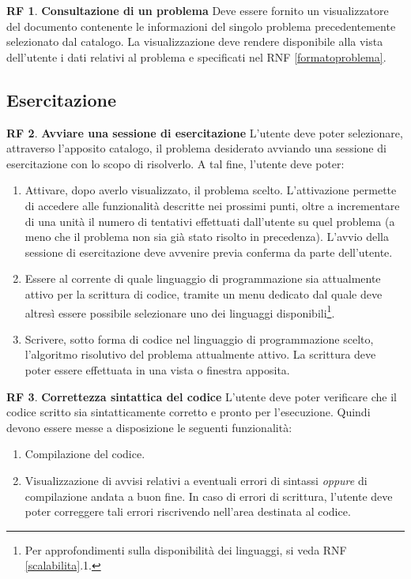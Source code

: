 \documentclass[11pt, a4paper]{article}
\theoremstyle{definition}
\newtheorem{funcreq}{RF} %
\begin{document}
\begin{funcreq}
\label{seeproblem}
\textbf{Consultazione di un problema }
Deve essere fornito un visualizzatore del documento contenente le
informazioni del singolo problema precedentemente selezionato dal
catalogo. La visualizzazione deve rendere disponibile alla vista
dell'utente i dati relativi al problema e specificati nel RNF
\ref{formatoproblema}.
\end{funcreq}

\subsection{Esercitazione}
\begin{funcreq}
\label{exesession}
\textbf{Avviare una sessione di esercitazione }
L'utente deve poter selezionare, attraverso l'apposito catalogo, il
problema desiderato avviando una sessione di esercitazione con lo scopo
di risolverlo. A tal fine, l'utente deve poter:
\begin{enumerate}
    \item Attivare, dopo averlo visualizzato, il problema scelto. L'attivazione permette di accedere alle funzionalità descritte nei prossimi punti, oltre a incrementare di una unità il numero di tentativi
    effettuati dall'utente su quel problema (a meno che il problema non
    sia già stato risolto in precedenza). L'avvio della sessione di
    esercitazione deve avvenire previa conferma da parte dell'utente.
    
    \item Essere al corrente di quale linguaggio di programmazione sia
    attualmente attivo per la scrittura di codice, tramite un menu dedicato
    dal quale deve altresì essere possibile selezionare uno dei linguaggi
    disponibili\footnote{Per approfondimenti sulla disponibilità dei linguaggi, si veda RNF \ref{scalabilita}.1.}.
    
    \item Scrivere, sotto forma di codice nel linguaggio di programmazione
    scelto, l'algoritmo risolutivo del problema attualmente attivo. La
    scrittura deve poter essere effettuata in una vista o finestra apposita.
\end{enumerate}
\end{funcreq}

\begin{funcreq}
\label{sintax}
\textbf{Correttezza sintattica del codice }
L'utente deve poter verificare che il codice scritto sia sintatticamente
corretto e pronto per l'esecuzione. Quindi devono essere messe a disposizione
le seguenti funzionalità:
\begin{enumerate}
    \item Compilazione del codice.
    \item Visualizzazione di avvisi relativi a eventuali errori di sintassi
    \textit{oppure} di compilazione andata a buon fine. In caso di errori
    di scrittura, l'utente deve poter correggere tali errori riscrivendo
    nell'area destinata al codice.
\end{enumerate}
\end{funcreq}
\end{document}
